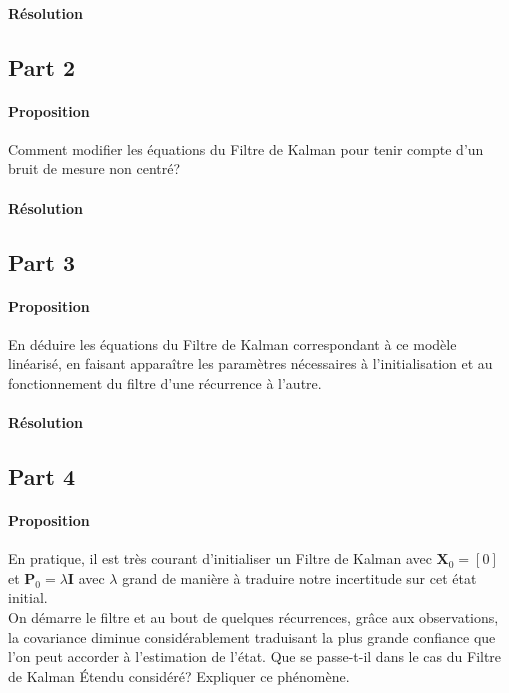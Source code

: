 \documentclass{article}
\begin{document}
\paragraph{Résolution}


\subsection{Part 2}
\paragraph{Proposition}Comment modifier les équations du Filtre de Kalman pour tenir compte d'un bruit de mesure non centré?

\paragraph{Résolution}


\subsection{Part 3}
\paragraph{Proposition}En déduire les équations du Filtre de Kalman correspondant à ce modèle linéarisé, en faisant apparaître les paramètres nécessaires à l'initialisation et au fonctionnement du filtre d'une récurrence à l'autre.

\paragraph{Résolution}


\subsection{Part 4}
\paragraph{Proposition}En pratique, il est très courant d'initialiser un Filtre de Kalman avec $\mathbf{X}_{0} = [0]$ et $\mathbf{P}_{0} = \lambda \mathbf{I}$ avec $\lambda$ grand de manière à traduire notre incertitude sur cet état initial.\\

\noindent On démarre le filtre et au bout de quelques récurrences, grâce aux observations, la covariance diminue considérablement traduisant la plus grande confiance que l'on peut accorder à l'estimation de l'état. Que se passe-t-il dans le cas du Filtre de Kalman Étendu considéré? Expliquer ce phénomène.
\end{document}
